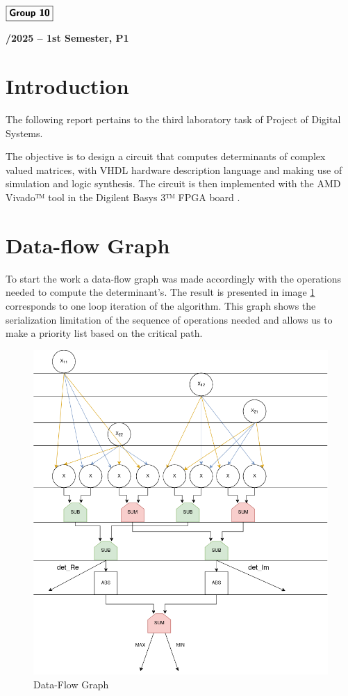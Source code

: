\documentclass[12pt]{article}
\begin{document}
\begin{flushleft}
    \large $\boxed{\text{\bf \fontfamily{cmss}\selectfont Group 10}}$\\[4.0cm]
\end{flushleft}
    
\begin{center}
    \large \bf {}/2025 -- 1st Semester, P1
\end{center}

\thispagestyle{empty}

\setcounter{page}{0}

\newpage



\section{Introduction}
The following report pertains to the third laboratory task of Project of Digital Systems.

The objective is to design a circuit that computes determinants of complex valued matrices, with VHDL hardware description language and making use of simulation and logic synthesis. The circuit is then implemented with the AMD Vivado™ tool \cite{amd-vivado} in the Digilent Basys 3™ FPGA board \cite{basys3-board}. 

\section{Data-flow Graph}
To start the work a data-flow graph was made accordingly with the operations needed to compute the determinant's. The result is presented in image \ref{fig:dataflow} corresponds to one loop iteration of the algorithm. This graph shows the serialization limitation of the sequence of operations needed and allows us to make a priority list based on the critical path.

\begin{figure}[H]
	\centering
	\includegraphics[width=0.55\linewidth]{images/DataFlowGraph.png}
	\caption{Data-Flow Graph}
	\label{fig:dataflow}
\end{figure}
\end{document}
